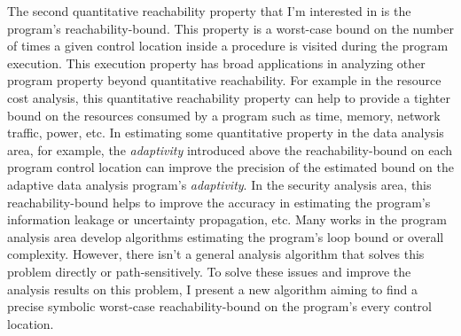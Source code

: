 \begin{abstractpage}
The second quantitative reachability property that I'm interested in is the program's reachability-bound.
This property is a worst-case bound on the number of times a given control location 
 inside a procedure is visited during the program execution.
This execution property has broad
applications in analyzing other program property beyond quantitative reachability.
For example in the resource cost analysis, this quantitative reachability property
can help to provide a tighter
bound on the resources consumed by a program such as time, memory,
network traffic, power, etc.
In estimating some quantitative property
in the data analysis area, for example, the \emph{adaptivity}
introduced above
the reachability-bound on each program control location
can improve the precision of the estimated bound on the adaptive data analysis program's \emph{adaptivity}.
In the security analysis area, this reachability-bound helps to improve the accuracy
in estimating the program's information leakage or uncertainty propagation, etc.
Many works in the program analysis area develop algorithms estimating the program's loop bound or overall complexity.
However, there isn't a general analysis algorithm that solves this problem directly or path-sensitively.
To solve these issues and improve the analysis results on this problem, I present a new algorithm
aiming to find a precise symbolic worst-case reachability-bound on the program's every control location.




\end{abstractpage}
